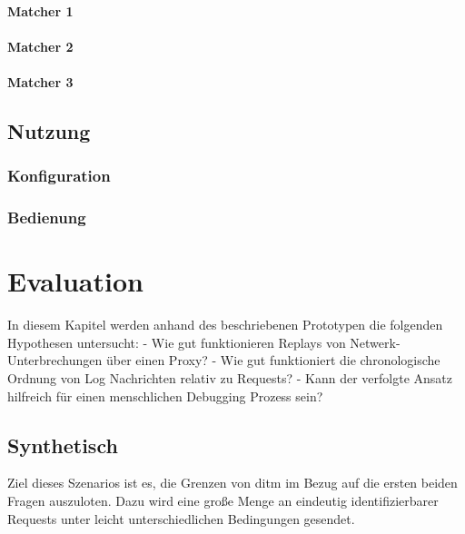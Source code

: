 \documentclass[a4paper]{report}
\begin{document}
\subsubsection{Matcher 1}
\subsubsection{Matcher 2}
\subsubsection{Matcher 3}

\section{Nutzung}
\subsection{Konfiguration}
\subsection{Bedienung}

\chapter{Evaluation}
In diesem Kapitel werden anhand des beschriebenen Prototypen die folgenden Hypothesen untersucht:
- Wie gut funktionieren Replays von Netwerk-Unterbrechungen über einen Proxy?
- Wie gut funktioniert die chronologische Ordnung von Log Nachrichten relativ zu Requests?
- Kann der verfolgte Ansatz hilfreich für einen menschlichen Debugging Prozess sein?
\section{Synthetisch}
Ziel dieses Szenarios ist es, die Grenzen von ditm im Bezug auf die ersten beiden Fragen auszuloten.
Dazu wird eine große Menge an eindeutig identifizierbarer Requests unter leicht unterschiedlichen Bedingungen gesendet.
\end{document}
